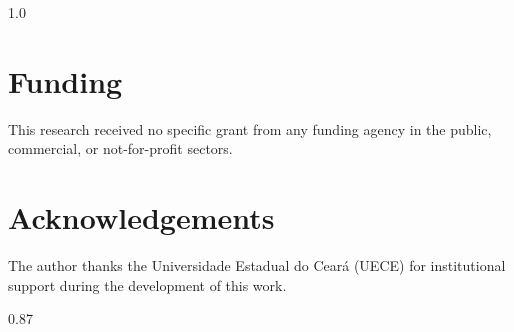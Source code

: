 \begin{spacing}{1.0}
\section*{Funding}
This research received no specific grant from any funding agency in the
public, commercial, or not-for-profit sectors. 

\section*{Acknowledgements}
The author thanks the Universidade Estadual do Cear\'{a} (UECE) for
institutional support during the development of this work.

\end{spacing}
\endgroup

\begingroup
\scriptsize
\setlength{\bibsep}{0pt}
\begin{spacing}{0.87}


\end{spacing}
\endgroup
